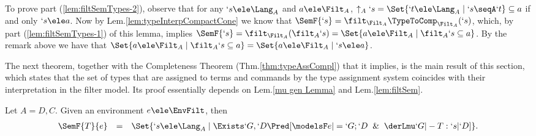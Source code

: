 \documentclass{lmcs}
\begin{document}
\begin{Proof}
\begin{description}
 \end{description}

To prove part (\ref{lem:filtSemTypes-2}), observe that for any $`s\ele \Lang_A$ and $a \ele \Filt_A$, $\uparrow_A`s = \Set{`t \ele \Lang_A \mid `s\seqA`t} \subseteq a$ if and only $`s\ele a$. 
Now by Lem.\skp\ref{lem:typeInterpCompactCone} we know that $\SemF {`s} = \filt_{\Filt_A} \TypeToComp_{\Filt_A}(`s)$, which, by part (\ref{lem:filtSemTypes-1}) of this
lemma, implies $\SemF {`s} = \filt_{\Filt_A}(\filt_A `s) = \Set{a \ele \Filt_A \mid \filt_A `s \subseteq a}$. 
By the remark above we have that $\Set{a \ele \Filt_A \mid \filt_A `s \subseteq a} = \Set{a \ele \Filt_A \mid `s \ele a}$. %
 \end{Proof}

The next theorem, together with the Completeness Theorem (Thm.\skp\ref{thm:typeAssCompl}) that it implies, is the main result of this section, which states that the set of types that are assigned to terms and commands by the type assignment system coincides with their interpretation in the filter model.
Its proof essentially depends on Lem.\skp\ref{mu gen Lemma} and Lem.\skp\ref{lem:filtSem}.

 \begin{thm} \label{thm:filter-term interpretation}
Let $A = D,C$.
Given an environment $e \ele \EnvFilt$, then
%
 \[ \begin{array}{rcl}
	\SemF { T}{ e } &=& \Set{`s \ele \Lang_A \mid \Exists`G,`D \Pred [{ \modelsF e |= `G;`D \And \derLmu `G |- T : `s | `D }] }.
 \end{array} \]
 \end{thm}
\end{document}
